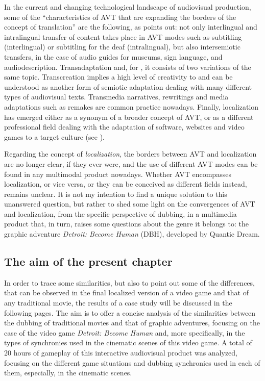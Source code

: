 \documentclass[output=paper]{langsci/langscibook}
\begin{document}
In the current and changing technological landscape of audiovisual production, some of the \enquote{characteristics of AVT that are expanding the borders of the concept of translation} are the following, as \textcite[88]{chaume18b} points out: not only interlingual and intralingual transfer of content takes place in AVT modes such as subtitling (interlingual) or subtitling for the deaf (intralingual), but also intersemiotic transfers, in the case of audio guides for museums, sign language, and audiodescription. Transadaptation \parencites{neves05}{gambier03}  and, for \textcite{pruys09}, it consists of two variations of the same topic. Transcreation implies a high level of creativity to  and can be understood as another form of semiotic adaptation dealing with many different types of audiovisual texts. Transmedia narratives, rewritings \parencite{bernal15} and media adaptations such as remakes are common practice nowadays. Finally, localization has emerged either as a synonym of a broader concept of AVT, or as a different professional field dealing with the adaptation of software, websites and video games to a target culture (see ).

Regarding the concept of \textit{localization}, the borders between AVT and localization are no longer clear, if they ever were, and the use of different AVT modes can be found in any multimodal product nowadays. Whether AVT encompasses localization, or vice versa, or they can be conceived as different fields instead, remains unclear. It is not my intention to find a unique solution to this unanswered question, but rather to shed some light on the convergences of AVT and localization, from the specific perspective of dubbing, in a multimedia product that, in turn, raises some questions about the genre it belongs to: the graphic adventure \textit{Detroit: Become Human} (DBH), developed by Quantic Dream.

\subsection{The aim of the present chapter}

In order to trace some similarities, but also to point out some of the differences, that can be observed in the final localized version of a video game and that of any traditional movie, the results of a case study will be discussed in the following pages. The aim is to offer a concise analysis of the similarities between the dubbing of traditional movies and that of graphic adventures, focusing on the case of the video game \textit{Detroit: Become Human} and, more specifically, in the types of synchronies used in the cinematic scenes of this video game. A total of 20 hours of gameplay of this interactive audiovisual product was analyzed, focusing on the different game situations and dubbing synchronies used in each of them, especially, in the cinematic scenes.
\end{document}

